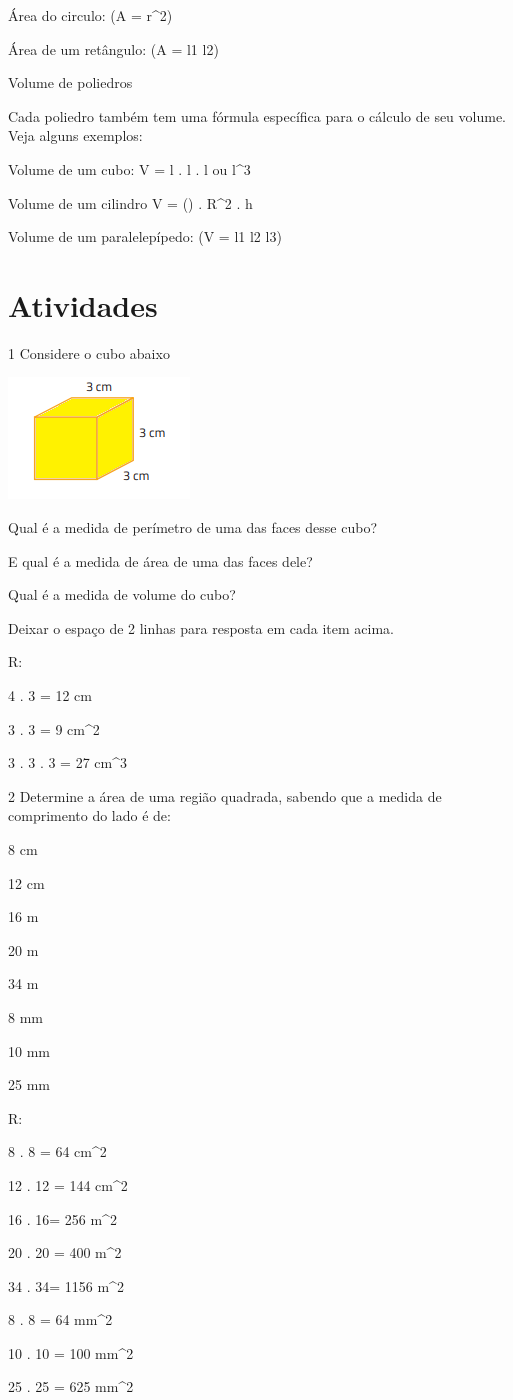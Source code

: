 {Área do circulo: (A = \pi r^{2})

Área de um retângulo: (A = l1 \times l2)

Volume de poliedros

Cada poliedro também tem uma fórmula específica para o cálculo de seu
volume. Veja alguns exemplos:

Volume de um cubo: V = l . l . l ou l^3

Volume de um cilindro V = (\Pi) . R^2 . h

Volume de um paralelepípedo: (V = l1 \times l2 \times l3)

\section{Atividades}

\num{1} Considere o cubo abaixo

\includegraphics[width=1.89583in,height=1.27083in]{./imgSAEB_8_MAT/media/image42.png}
\item Qual é a medida de perímetro de uma das faces desse cubo?
\item E qual é a medida de área de uma das faces dele?
\item Qual é a medida de volume do cubo?

Deixar o espaço de 2 linhas para resposta em cada item acima.

R:
\item 4 . 3 = 12 cm
\item 3 . 3 = 9 cm^2
\item 3 . 3 . 3 = 27 cm^3

\num{2} Determine a área de uma região quadrada, sabendo que a medida de
comprimento do lado é de:
\item 8 cm
\item 12 cm
\item 16 m
\item 20 m
\item 34 m
\item 8 mm
\item 10 mm
\item 25 mm

R:
\item 8 . 8 = 64 cm^2
\item 12 . 12 = 144 cm^2
\item16 . 16= 256 m^2
\item20 . 20 = 400 m^2
\item34 . 34= 1156 m^2
\item 8 . 8 = 64 mm^2
\item 10 . 10 = 100 mm^2
\item 25 . 25 = 625 mm^2

}
